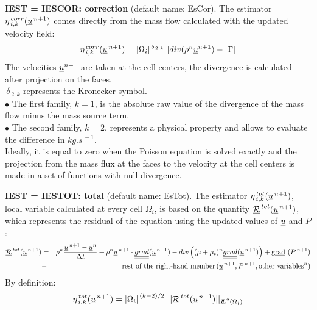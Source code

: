 {\bf IEST = IESCOR: correction}  (default name: EsCor).      
The estimator $ \eta^{\,corr}_{\,i,k}(\underline{u}^{\,n+1})$ comes directly
from the mass flow calculated with the updated velocity field:          
\begin{eqnarray*}
            \eta^{\,corr}_{\,i,k}(\vect{u}^{\,n+1})=
|\Omega_i|^{\,\delta_{\,2,k}}\ |div (\rho^n \vect{u}^{n+1}) -\ \Gamma|                          
\end{eqnarray*} 
The velocities $\underline{u}^{n+1}$ are taken at the cell centers,
the divergence is calculated after projection on the faces.\\
            $ \,\delta_{\,2,k}$ represents the Kronecker symbol.\\
\hspace*{0.5cm}$\bullet$ The first family, $k=1$, is the absolute raw
value of the divergence of the mass flow minus the mass source term.\\
\hspace*{0.5cm}$\bullet$ The second family, $k=2$, represents a physical
property and allows to evaluate the difference in $kg.s^{\,-1}$.\\
Ideally, it is equal to zero when the Poisson equation is solved exactly and
the projection from the mass flux at the faces to the velocity at the cell
centers is made in a set of  functions with null divergence.
                             
{\bf IEST = IESTOT: total} (default name: EsTot). 
The estimator $ \eta^{\,tot}_{\,i,k}(\underline{u}^{\,n+1})$, local variable
calculated at every cell $\Omega_i$, is based on the quantity
$\underline{\mathcal R}^{\,tot}(\underline{u}^{\,n+1})$, which represents the
residual of the equation using the updated values of
$\underline{u}$ and $P$:  
\begin{eqnarray*}
\underline{\mathcal R}^{\,tot}(\underline{u}^{\,n+1})&= & \rho^n \frac{\underline{u}^{\,n+1}-\underline{u}^n}{\Delta t} 
              + \rho^n \underline{u}^{\,n+1} \cdot \underline{\underline{grad}}(\underline{u}^{\,n+1})        
              - div \left((\mu+\mu_t)^n \underline{\underline{grad}}(\underline{u}^{\,n+1}) \right)
              + \text{g}\underline{\text{rad}}\ (P^{\,n+1})     \\
              &- &\text{rest of the right-hand member} 
                        \,(\underline{u}^{\,n+1}, P^{\,n+1}, \text{other variables}^n)
\end{eqnarray*}
By definition: 
$$ \eta^{\,tot}_{\,i,k}(\underline{u}^{\,n+1})= {|\Omega_i|}^{\,(k-2)/2}\ ||\underline{\mathcal R}^{\,tot}(\underline{u}^{\,n+1})||
_{{I\hspace{-.25em}L}^{2}(\Omega_i)}$$


